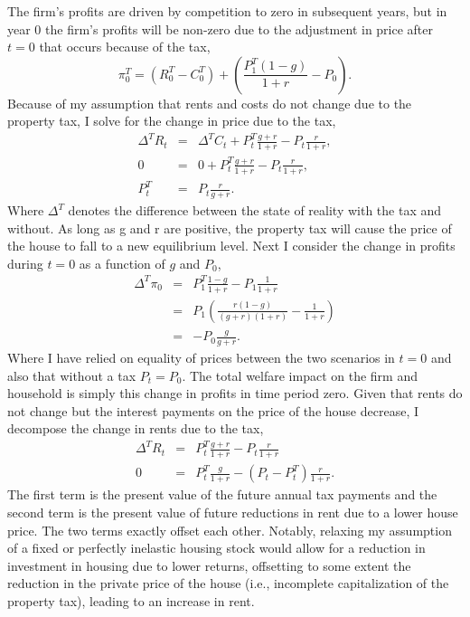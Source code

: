 \documentclass[ecta,nameyear,draft]{econsocart}
\theoremstyle{plain}
\theoremstyle{remark}
\begin{document}
The firm's profits are driven by competition to zero in subsequent years, but in year 0 the firm's profits will be non-zero due to the adjustment in price after $t=0$ that occurs because of the tax,
\begin{equation*}
	\pi^T_0 = (R^T_0-C^T_0)+\left(\frac{P^T_{1}(1-g)}{1+r}-P_0\right).\label{piT0}
\end{equation*}
Because of my assumption that rents and costs do not change due to the property tax, I solve for the change in price due to the tax,
\begin{eqnarray}
	\Delta^T R_t&=&\Delta^T C_t+P^T_{t}\frac{g+r}{1+r}-P_{t} \frac{r}{1+r},\nonumber \\
	0&=&0+P^T_{t}\frac{g+r}{1+r}-P_{t} \frac{r}{1+r},\nonumber \\
	P^T_t&=& P_t\frac{r}{g+r}.\label{TxPrice} \label{Ptax}
\end{eqnarray}
Where $\Delta^T$ denotes the difference between the state of reality with the tax and without. As long as g and r are positive, the property tax will cause the price of the house to fall to a new equilibrium level.
Next I consider the change in profits during $t=0$ as a function of $g$ and $P_0$,
\begin{eqnarray*}
	\Delta^T \pi_0 &=& P_1^T\frac{1-g}{1+r}-P_1\frac{1}{1+r}\\
	&=& P_1\left(\frac{r(1-g)}{(g+r)(1+r)}-\frac{1}{1+r}\right)\\
	&=&-P_0\frac{g}{g+r}.
\end{eqnarray*}
Where I have relied on equality of prices between the two scenarios in $t=0$ and also that without a tax $P_t=P_0$. The total welfare impact on the firm and household is simply this change in profits in time period zero.
Given that rents do not change but the interest payments on the price of the house decrease, I decompose the change in rents due to the tax,
\begin{eqnarray*}
	\Delta^T R_t&=&P^T_t\frac{g+r}{1+r}-P_t\frac{r}{1+r}\\
	0&=&P^T_t\frac{g}{1+r}-(P_t-P_t^T)\frac{r}{1+r}.
\end{eqnarray*}
The first term is the present value of the future annual tax payments and the second term is the present value of future reductions in rent due to a lower house price. The two terms exactly offset each other. Notably, relaxing my assumption of a fixed or perfectly inelastic housing stock would allow for a reduction in investment in housing due to lower returns, offsetting to some extent the reduction in the private price of the house (i.e., incomplete capitalization of the property tax), leading to an increase in rent.
\end{document}
